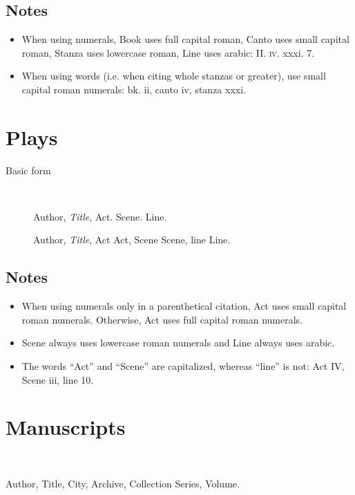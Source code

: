 \documentclass[extrafontsizes,11pt,a4paper,oneside]{memoir}
\newcommand*{\lit}[1]{\textsf{#1}}
\begin{document}
\subsection{Notes}
\begin{itemize}
  \item When using numerals, Book uses full capital roman, Canto uses small capital roman, Stanza uses lowercase roman, Line uses arabic: II. \textsc{iv}. xxxi. 7.
  
  \item When using words (i.e. when citing whole stanzas or greater), use small capital roman numerals: bk. ii, canto iv, stanza xxxi.
\end{itemize}

\section{Plays}\label{sec:play}

\begin{description}
  \item[Basic form]~
  \par Author, \emph{Title}, Act. Scene. Line.
  \par Author, \emph{Title}, \lit{Act} Act, \lit{Scene} Scene, \lit{line} Line.
\end{description}

\subsection{Notes}
\begin{itemize}
  \item When using numerals only in a parenthetical citation, Act uses small capital roman numerals. Otherwise, Act uses full capital roman numerals.
  
  \item Scene always uses lowercase roman numerals and Line always uses arabic.
  
  \item The words \enquote{Act} and \enquote{Scene} are capitalized, whereas \enquote{line} is not: Act IV, Scene iii, line 10.
\end{itemize}

\section{Manuscripts}\label{sec:ms}

\begin{description}
  \item[Form]~
  \item Author, Title, City, Archive, Collection Series, Volume.
\end{description}
\end{document}
